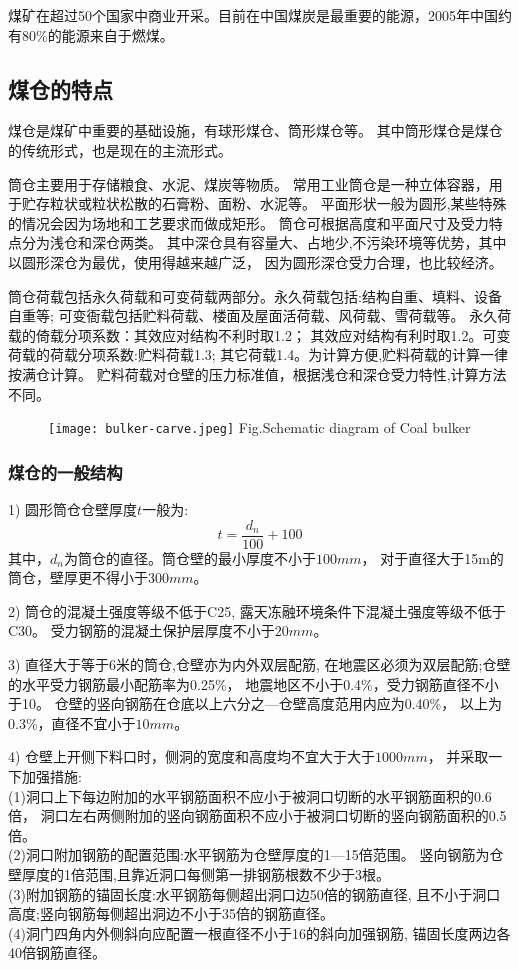 煤矿在超过50个国家中商业开采。目前在中国煤炭是最重要的能源，2005年中国约有$80\%$的能源来自于燃煤。

\subsection{煤仓的特点}
煤仓是煤矿中重要的基础设施，有球形煤仓、筒形煤仓等。
其中筒形煤仓是煤仓的传统形式，也是现在的主流形式。

筒仓主要用于存储粮食、水泥、煤炭等物质。
常用工业筒仓是一种立体容器，用于贮存粒状或粒状松散的石膏粉、面粉、水泥等。
平面形状一般为圆形,某些特殊的情况会因为场地和工艺要求而做成矩形。
筒仓可根据高度和平面尺寸及受力特点分为浅仓和深仓两类。
其中深仓具有容量大、占地少,不污染环境等优势，其中以圆形深仓为最优，使用得越来越广泛，
因为圆形深仓受力合理，也比较经济。

筒仓荷载包括永久荷载和可变荷载两部分。永久荷载包括:结构自重、填料、设备自重等;
可变衙载包括贮料荷载、楼面及屋面活荷载、风荷载、雪荷载等。
永久荷载的倚载分项系数：其效应对结构不利时取1.2；
其效应对结构有利时取1.2。可变荷载的荷载分项系数:贮料荷载1.3;
其它荷载1.4。为计算方便,贮料荷载的计算一律按满仓计算。
贮料荷载对仓壁的压力标准值，根据浅仓和深仓受力特性,计算方法不同。
\begin{figure}[!htbp]
   \centering
   \texttt{[image: bulker-carve.jpeg]}
		{Fig.}{Schematic diagram of Coal bulker}
\end{figure}

\subsubsection*{煤仓的一般结构}
1) 圆形筒仓仓壁厚度$t$一般为:
\begin{equation}
t=\frac{d_n}{100}+100
\end{equation}
其中，$d_n$为筒仓的直径。筒仓壁的最小厚度不小于$100mm$，
对于直径大于15m的筒仓，壁厚更不得小于$300mm$。

2) 筒仓的混凝土强度等级不低于C25,
	露天冻融环境条件下混凝土强度等级不低于C30。
	受力钢筋的混凝土保护层厚度不小于$20mm$。

3) 直径大于等于6米的筒仓,仓壁亦为内外双层配筋,
	在地震区必须为双层配筋;仓壁的水平受力钢筋最小配筋率为0.25\%，
	地震地区不小于0.4\%，受力钢筋直径不小于10。
	仓壁的竖向钢筋在仓底以上六分之—仓壁高度范用内应为0.40\%，
	以上为0.3\%，直径不宜小于$10mm$。

4) 仓壁上开侧下料口时，侧洞的宽度和高度均不宜大于大于$1000mm$，
	并采取一下加强措施:\\
    (1)洞口上下每边附加的水平钢筋面积不应小于被洞口切断的水平钢筋面积的0.6倍，
       洞口左右两侧附加的竖向钢筋面积不应小于被洞口切断的竖向钢筋面积的0.5倍。\\
    (2)洞口附加钢筋的配置范围:水平钢筋为仓壁厚度的1—15倍范围。
	竖向钢筋为仓壁厚度的1倍范围,且靠近洞口每侧第一排钢筋根数不少于3根。\\
    (3)附加钢筋的锚固长度:水平钢筋每侧超出洞口边50倍的钢筋直径,
	且不小于洞口高度;竖向钢筋每侧超出洞边不小于35倍的钢筋直径。\\
    (4)洞门四角内外侧斜向应配置一根直径不小于16的斜向加强钢筋,
	锚固长度两边各40倍钢筋直径。

